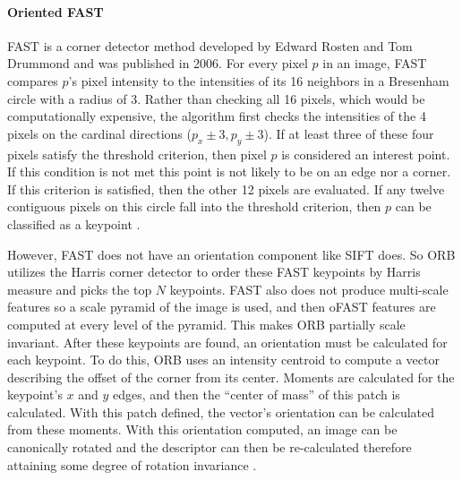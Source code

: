 \documentclass[stu,hidelinks,floatsintext,donotrepeattitle]{apa7}
\begin{document}
\paragraph{Oriented FAST}
FAST is a corner detector method developed by Edward Rosten and Tom Drummond and was published in 2006. For every pixel $p$ in an image, FAST compares $p$'s pixel intensity to the intensities of its 16 neighbors in a Bresenham circle with a radius of 3. Rather than checking all 16 pixels, which would be computationally expensive, the algorithm first checks the intensities of the 4 pixels on the cardinal directions ($p_x \pm 3, p_y \pm 3$). If at least three of these four pixels satisfy the threshold criterion, then pixel $p$ is considered an interest point. If this condition is not met this point is not likely to be on an edge nor a corner. If this criterion is satisfied, then the other 12 pixels are evaluated. If any twelve contiguous pixels on this circle fall into the threshold criterion, then $p$ can be classified as a keypoint \parencite{fast}.\par
However, FAST does not have an orientation component like SIFT does. So ORB utilizes the Harris corner detector to order these FAST keypoints by Harris measure and picks the top $N$ keypoints. FAST also does not produce multi-scale features so a scale pyramid of the image is used, and then oFAST features are computed at every level of the pyramid. This makes ORB partially scale invariant. After these keypoints are found, an orientation must be calculated for each keypoint. To do this, ORB uses an intensity centroid to compute a vector describing the offset of the corner from its center. Moments are calculated for the keypoint's $x$ and $y$ edges, and then the ``center of mass'' of this patch is calculated. With this patch defined, the vector's orientation can be calculated from these moments. With this orientation computed, an image can be canonically rotated and the descriptor can then be re-calculated therefore attaining some degree of rotation invariance \parencite{orb}.
\end{document}
